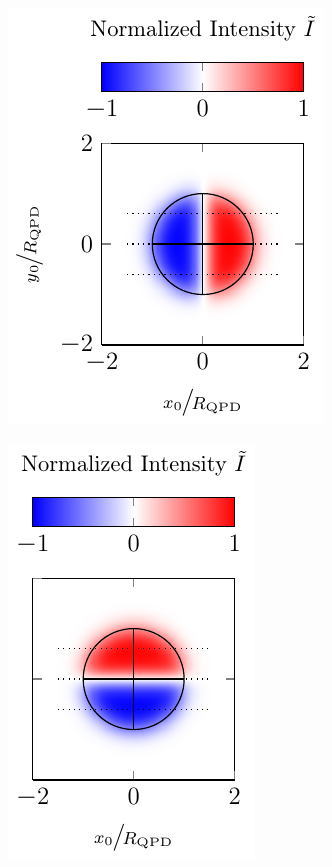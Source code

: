  \begin{figure}
  \centering
  \begin{subfigure}[b]{0.35\textwidth}
    \centering
    \includegraphics[]{Plots/cache/QPDx.pdf}
    \label{fig:TO-QPDx}
  \end{subfigure}
  \hfill
  \begin{subfigure}[b]{0.3\textwidth}
    \centering
    \includegraphics[]{Plots/cache/QPDy.pdf}

\end{subfigure}
\end{figure}
